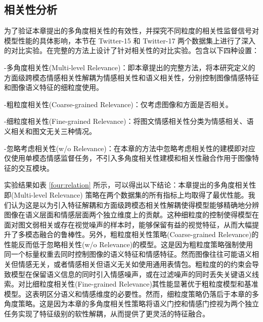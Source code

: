 \subsection{相关性分析}

为了验证本章提出的多角度相关性的有效性，并探究不同粒度的相关性监督信号对模型性能的具体影响，本节在 Twitter-15 和 Twitter-17 两个数据集上进行了深入的对比实验。在完整的方法上设计了针对相关性的对比实验。包含以下四种设置：

-多角度相关性(Multi-level Relevance)：即本章提出的完整方法，将本研究定义的方面级跨模态情感相关性解耦为情感相关性和语义相关性，分别控制图像情感特征和图像语义特征的细粒度使用。

-粗粒度相关性(Coarse-grained Relevance)：仅考虑图像和方面是否相关。

-细粒度相关性(Fine-grained Relevance)：将图文情感相关性分类为情感相关、语义相关和图文无关三种情况。

-忽略考虑相关性(w/o Relevance)：在本章的方法中忽略考虑相关性的建模即对应仅使用单模态情感监督任务，不引入多角度相关性建模和相关性融合作用于图像特征的交互模块。

实验结果如表 \ref{four:relation} 所示，可以得出以下结论：本章提出的多角度相关性即(Multi-level Relevance) 策略在两个数据集的所有指标上均取得了最优性能。我们认为这是以为引入特征解耦和方面级跨模态相关性解耦使得模型能够精确地分辨图像在语义层面和情感层面两个独立维度上的贡献。这种细粒度的控制使得模型在面对图文弱相关或存在视觉噪声的样本时，能够保留有益的视觉特征，从而大幅提升了多模态融合的鲁棒性。另外，粗粒度相关性策略(Coarse-grained Relevance)的性能反而低于忽略相关性(w/o Relevance)的模型。这是因为粗粒度策略强制使用同一个标量权重去同时控制图像的语义特征和情感特征。然而图像往往可能语义相关但情感无关，或者情感相关但语义无关如使用通用表情包。粗粒度的的约束会导致模型在保留语义信息的同时引入情感噪声，或在过滤噪声的同时丢失关键语义线索。对比细粒度相关性(Fine-grained Relevance)其性能显著优于粗粒度模型和基准模型。这表明区分语义和情感维度的必要性。然而，细粒度策略仍落后于本章的多角度策略。这是因为本章的多角度相关性策略将语义门控和情感门控视为两个独立任务实现了特征级别的软性解耦，从而提供了更灵活的特征融合。



